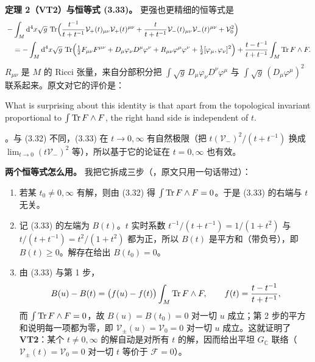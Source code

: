 \textbf{定理 2（VT2）与恒等式 (3.33)。} 更强也更精细的恒等式是\pA{}
\begin{equation}
\begin{aligned}
&-\int_M \mathrm{d}^4x\sqrt g\,\operatorname{Tr}\Bigl(\frac{t^{-1}}{t+t^{-1}}\mathcal V_+(t)_{\mu\nu}\mathcal V_+(t)^{\mu\nu}
+\frac{t}{t+t^{-1}}\mathcal V_-(t)_{\mu\nu}\mathcal V_-(t)^{\mu\nu}+\mathcal V_0^2\Bigr)\\
&\quad=-\int_M \mathrm{d}^4x\sqrt g\,\operatorname{Tr}\Bigl(\tfrac12 F_{\mu\nu}F^{\mu\nu}
+D_\mu\varphi_\nu D^\mu\varphi^\nu+R_{\mu\nu}\varphi^\mu\varphi^\nu
+\tfrac12[\varphi_\mu,\varphi_\nu]^2\Bigr)
+\frac{t-t^{-1}}{t+t^{-1}}\int_M\operatorname{Tr} F\wedge F .
\end{aligned}
\label{eq:vt2}
\end{equation}
$R_{\mu\nu}$ 是 $M$ 的 Ricci 张量，来自分部积分把 $\int\sqrt g\,D_\mu\varphi_\nu D^\nu\varphi^\mu$ 与 $\int\sqrt g\,(D_\mu\varphi^\mu)^2$ 联系起来\pA。原文对它的评价是：
\begin{origquote}
What is surprising about this identity is that apart from the topological invariant proportional to $\int\operatorname{Tr} F\wedge F$, the right hand side is independent of $t$.
\end{origquote}
\noindent
{}。与 (3.32) 不同，(3.33) 在 $t\to0,\infty$ 有自然极限（把 $t(\mathcal V_-)^2/(t+t^{-1})$ 换成 $\lim_{t\to0}(t\mathcal V_-)^2$ 等），所以基于它的论证在 $t=0,\infty$ 也有效\pA{}。

\textbf{两个恒等式怎么用。} 我把它拆成三步（\pB，原文只用一句话带过）：
\begin{enumerate}[label=\arabic*)]
\item 若某 $t_0\ne0,\infty$ 有解，则由 (3.32) 得 $\int\operatorname{Tr} F\wedge F=0$。于是 (3.33) 的右端与 $t$ 无关。
\item 记 (3.33) 的左端为 $B(t)$。$t$ 实时系数 $t^{-1}/(t+t^{-1})=1/(1+t^2)$ 与 $t/(t+t^{-1})=t^2/(1+t^2)$ 都为正，所以 $B(t)$ 是平方和（带负号），即 $B(t)\ge0$。解存在给出 $B(t_0)=0$。
\item 由 (3.33) 与第 1 步，
\begin{equation}
B(u)-B(t)=\bigl(f(u)-f(t)\bigr)\int_M\operatorname{Tr} F\wedge F,
\qquad
f(t)=\frac{t-t^{-1}}{t+t^{-1}},
\label{eq:Bdiff}
\end{equation}
而 $\int\operatorname{Tr} F\wedge F=0$，故 $B(u)=B(t_0)=0$ 对一切 $u$ 成立；第 2 步的平方和说明每一项都为零，即 $\mathcal V_\pm(u)=\mathcal V_0=0$ 对一切 $u$ 成立。这就证明了\textbf{VT2}：某个 $t\ne0,\infty$ 的解自动是对所有 $t$ 的解，因而给出平坦 $G_{\mathbb C}$ 联络（$\mathcal V_\pm(t)=\mathcal V_0=0$ 对一切 $t$ 等价于 $\mathcal F=0$）\pA{}。
\end{enumerate}

